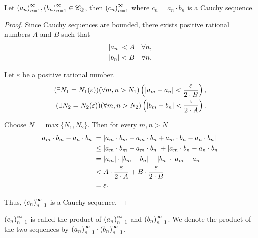 \begin{theorem}\label{theorem:chapter1:product-of-cauchy-sequences}
    Let ${\left({a_{n}}\right)}^{\infty}_{n=1}, {\left({b_{n}}\right)}^{\infty}_{n=1}\in\mathscr{C}_{\mathbb{Q}}$, then ${\left({c_{n}}\right)}^{\infty}_{n=1}$ where $c_{n} = a_{n} \cdot b_{n}$ is a Cauchy sequence.
\end{theorem}

\begin{proof}
    Since Cauchy sequences are bounded, there exists positive rational numbers $A$ and $B$ such that
    \[
        \begin{split}
            \left\vert{a_{n}}\right\vert < A\quad\forall n, \\
            \left\vert{b_{n}}\right\vert < B\quad\forall n.
        \end{split}
    \]

    Let $\varepsilon$ be a positive rational number.
    \[
        \begin{split}
            (\exists N_{1}=N_{1}(\varepsilon))(\forall m, n > N_{1})\left(\left\vert{a_{m} - a_{n}}\right\vert < \frac{\varepsilon}{2\cdot B}\right), \\
            (\exists N_{2}=N_{2}(\varepsilon))(\forall m, n > N_{2})\left(\left\vert{b_{m} - b_{n}}\right\vert < \frac{\varepsilon}{2\cdot A}\right).
        \end{split}
    \]

    Choose $N = \max\{ N_{1}, N_{2} \}$. Then for every $m, n > N$
    \begin{align*}
        \left\vert{a_{m}\cdot b_{m} - a_{n}\cdot b_{n}}\right\vert & = \left\vert{a_{m}\cdot b_{m} - a_{m}\cdot b_{n} + a_{m}\cdot b_{n} - a_{n}\cdot b_{n}}\right\vert         \\
                                                  & \le \left\vert{a_{m}\cdot b_{m} - a_{m}\cdot b_{n}}\right\vert + \left\vert{a_{m}\cdot b_{n} - a_{n}\cdot b_{n}}\right\vert \\
                                                  & = \left\vert{a_{m}}\right\vert\cdot\left\vert{b_{m} - b_{n}}\right\vert + \left\vert{b_{n}}\right\vert\cdot\left\vert{a_{m} - a_{n}}\right\vert               \\
                                                  & < A\cdot\frac{\varepsilon}{2\cdot A} + B\cdot\frac{\varepsilon}{2\cdot B}                 \\
                                                  & = \varepsilon.
    \end{align*}

    Thus, ${\left({c_{n}}\right)}^{\infty}_{n=1}$ is a Cauchy sequence.
\end{proof}

${\left({c_{n}}\right)}^{\infty}_{n=1}$ is called the product of ${\left({a_{n}}\right)}^{\infty}_{n=1}$ and ${\left({b_{n}}\right)}^{\infty}_{n=1}$. We denote the product of the two sequences by ${\left({a_{n}}\right)}^{\infty}_{n=1}\cdot{\left({b_{n}}\right)}^{\infty}_{n=1}$.

